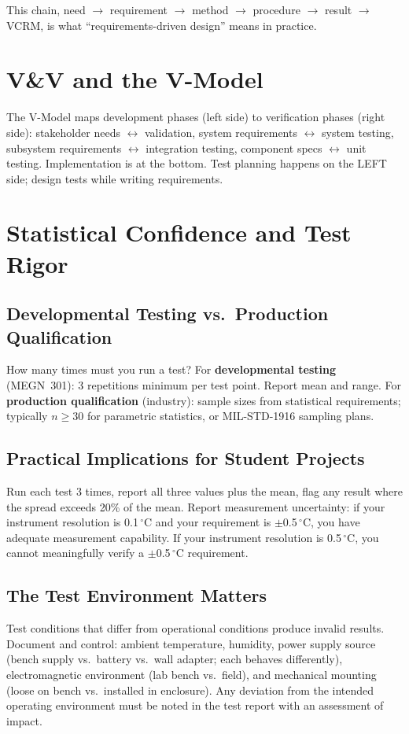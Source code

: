 \documentclass[11pt,letterpaper,twoside,openany]{book}
\newcommand{\degC}{\ensuremath{{}^{\circ}\text{C}}}
\begin{document}
This chain, need $\to$ requirement $\to$ method $\to$ procedure $\to$ result $\to$ VCRM, is what ``requirements-driven design'' means in practice.

\section{V\&V and the V-Model}
The V-Model maps development phases (left side) to verification phases (right side): stakeholder needs $\leftrightarrow$ validation, system requirements $\leftrightarrow$ system testing, subsystem requirements $\leftrightarrow$ integration testing, component specs $\leftrightarrow$ unit testing. Implementation is at the bottom. Test planning happens on the LEFT side; design tests while writing requirements.


\section{Statistical Confidence and Test Rigor}
\subsection{Developmental Testing vs.\ Production Qualification}
How many times must you run a test? For \textbf{developmental testing} (MEGN~301): 3 repetitions minimum per test point. Report mean and range. For \textbf{production qualification} (industry): sample sizes from statistical requirements; typically $n \geq 30$ for parametric statistics, or MIL-STD-1916 sampling plans.

\subsection{Practical Implications for Student Projects}
Run each test 3 times, report all three values plus the mean, flag any result where the spread exceeds 20\% of the mean. Report measurement uncertainty: if your instrument resolution is 0.1\,\degC{} and your requirement is $\pm$0.5\,\degC{}, you have adequate measurement capability. If your instrument resolution is 0.5\,\degC{}, you cannot meaningfully verify a $\pm$0.5\,\degC{} requirement.


\subsection{The Test Environment Matters}
Test conditions that differ from operational conditions produce invalid results. Document and control: ambient temperature, humidity, power supply source (bench supply vs.\ battery vs.\ wall adapter; each behaves differently), electromagnetic environment (lab bench vs.\ field), and mechanical mounting (loose on bench vs.\ installed in enclosure). Any deviation from the intended operating environment must be noted in the test report with an assessment of impact.
\end{document}
